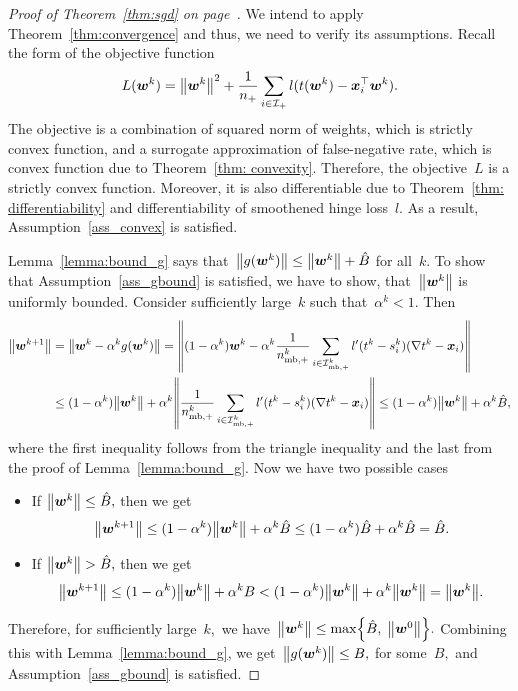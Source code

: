 \sgd*
\begin{proof}[Proof of Theorem~\ref{thm:sgd} on page~\pageref{thm:sgd}]
  We intend to apply Theorem~\ref{thm:convergence} and thus, we need to verify its assumptions. Recall the form of the objective function
  \begin{equation*}
    L(\bm{w}^k)
      = \norm{\bm{w}^k}^2 + \frac{1}{\npos} \sum_{i \in \Ipos} l(t(\bm{w}^k) - \bm{x}_i^{\top} \bm{w}^k).
  \end{equation*}
  The objective is a combination of squared norm of weights, which is strictly convex function, and a surrogate approximation of false-negative rate, which is convex function due to Theorem~\ref{thm: convexity}. Therefore, the objective~$L$ is a strictly convex function. Moreover, it is also differentiable due to Theorem~\ref{thm: differentiability} and differentiability of smoothened hinge loss~$l$. As a result, Assumption~\ref{ass_convex} is satisfied.

  Lemma~\ref{lemma:bound_g} says that~$\norm{g(\bm{w}^k)} \leq \norm{\bm{w}^k} + \hat{B}$ for all~$k.$ To show that Assumption~\ref{ass_gbound} is satisfied, we have to show, that~$\norm{\bm{w}^k}$ is uniformly bounded. Consider sufficiently large~$k$ such that~$\alpha^k < 1.$ Then
  \begin{align*}
    \norm{\bm{w}^{k+1}}
      & = \norm{\bm{w}^{k} - \alpha^k g(\bm{w}^{k})}
        = \norm{(1 - \alpha^k)\bm{w}^{k} - \alpha^k \frac{1}{\nmbpos^k} \sum_{i \in \Imbpos^k} l'(t^k - s_i^k)(\nabla t^k - \bm{x}_i)} \\
      & \leq (1 - \alpha^k) \norm{\bm{w}^{k}} + \alpha^k \norm{\frac{1}{\nmbpos^k} \sum_{i \in \Imbpos^k} l'(t^k - s_i^k)(\nabla t^k - \bm{x}_i)}
      \leq (1 - \alpha^k) \norm{\bm{w}^{k}} + \alpha^k \hat{B},
  \end{align*}
  where the first inequality follows from the triangle inequality and the last from the proof of Lemma~\ref{lemma:bound_g}. Now we have two possible cases
  \begin{itemize}
    \item If $\norm{\bm{w}^k} \leq \hat{B},$ then we get
    \begin{equation*}
      \norm{\bm{w}^{k+1}}
        \leq (1 - \alpha^k) \norm{\bm{w}^{k}} + \alpha^k \hat{B}
        \leq (1 - \alpha^k) \hat{B} + \alpha^k \hat{B}
        = \hat{B}.
    \end{equation*}
    \item If $\norm{\bm{w}^k} > \hat{B},$ then we get
    \begin{equation*}
      \norm{\bm{w}^{k+1}}
        \leq (1 - \alpha^k) \norm{\bm{w}^{k}} + \alpha^k B
        < (1 - \alpha^k) \norm{\bm{w}^{k}} + \alpha^k \norm{\bm{w}^{k}}
        = \norm{\bm{w}^{k}}.
    \end{equation*}
  \end{itemize}
  Therefore, for sufficiently large~$k,$ we have~$\norm{\bm{w}^{k}} \leq \max \Brac[c]{\hat{B}, \; \norm{\bm{w}^0}}.$ Combining this with Lemma~\ref{lemma:bound_g}, we get~$\norm{g(\bm{w}^k)} \leq B,$ for some~$B,$ and Assumption~\ref{ass_gbound} is satisfied.


\end{proof}
